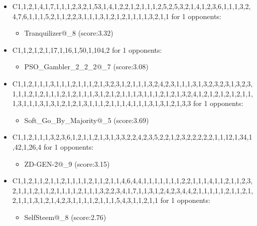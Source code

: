 \begin{appendices}
\begin{itemize}
        \item C1,1,2,1,4,1,7,1,1,1,2,3,2,1,53,1,4,1,2,2,1,2,1,1,1,2,5,2,5,3,2,1,4,1,2,3,6,1,1,1,3,2,4,7,6,1,1,1,5,2,1,1,2,2,3,1,1,1,3,1,2,1,2,1,1,1,1,3,2,1,1 for 1 opponents:
        \begin{multicols}{3}
            \begin{itemize}
                \item Tranquilizer@\_8 (score:3.32)
            \end{itemize}
        \end{multicols}

        \item C1,1,2,1,2,1,17,1,16,1,50,1,104,2 for 1 opponents:
        \begin{multicols}{3}
            \begin{itemize}
                \item PSO\_Gambler\_2\_2\_2@\_7 (score:3.08)
            \end{itemize}
        \end{multicols}

        \item C1,1,2,1,1,1,3,1,1,1,2,1,1,1,2,1,3,2,3,1,2,1,1,1,3,2,4,2,3,1,1,1,3,1,3,2,3,2,3,1,3,2,3,1,1,1,2,1,2,1,1,1,2,1,2,1,1,1,3,1,2,1,2,1,1,1,3,1,1,1,2,1,2,1,3,2,4,1,2,1,2,1,2,1,2,1,1,1,3,1,1,1,3,1,3,1,2,1,2,1,3,1,1,1,2,1,1,1,4,1,1,1,3,1,3,1,2,1,3,3 for 1 opponents:
        \begin{multicols}{3}
            \begin{itemize}
                \item Soft\_Go\_By\_Majority@\_5 (score:3.69)
            \end{itemize}
        \end{multicols}

        \item C1,1,2,1,1,1,3,2,3,6,1,2,1,1,2,1,3,1,3,3,2,2,4,2,3,5,2,2,1,2,3,2,2,2,2,2,1,1,12,1,34,1,42,1,26,4 for 1 opponents:
        \begin{multicols}{3}
            \begin{itemize}
                \item ZD-GEN-2@\_9 (score:3.15)
            \end{itemize}
        \end{multicols}

        \item C1,1,2,1,1,2,1,1,2,1,1,1,1,2,1,1,2,1,1,4,6,4,4,1,1,1,1,1,1,1,2,2,1,1,1,4,1,1,2,1,1,2,3,2,1,1,1,2,1,1,2,1,1,1,1,2,1,1,1,3,2,2,3,4,1,7,1,1,3,1,2,4,2,3,4,4,2,1,1,1,1,1,2,1,1,2,1,2,1,1,1,3,1,2,1,4,2,3,1,1,1,1,2,1,1,1,5,4,3,1,1,2,1,1 for 1 opponents:
        \begin{multicols}{3}
            \begin{itemize}
                \item SelfSteem@\_8 (score:2.76)
            \end{itemize}
        \end{multicols}


\end{itemize}
\end{appendices}
